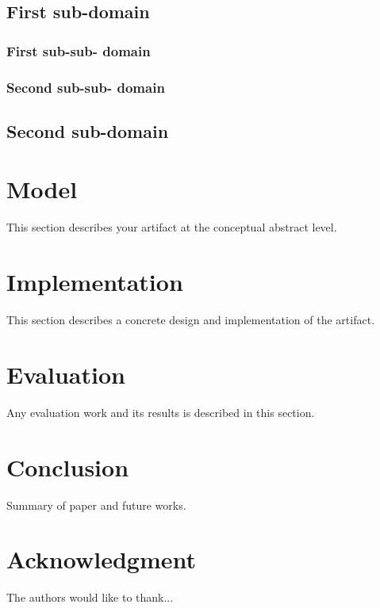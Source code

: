 \documentclass[10pt, conference, compsocconf]{IEEEtran}
\begin{document}
\subsection{First sub-domain}

\subsubsection{First sub-sub- domain}

\subsubsection{Second sub-sub- domain}

\subsection{Second sub-domain}



\section{Model}\label{sec:model}

This section describes your artifact at the conceptual abstract level.




\section{Implementation}\label{sec:implementation}
This section describes a concrete design and implementation of the artifact.



\section{Evaluation}\label{sec:evaluation}
Any evaluation work and its results is described in this section. 


\section{Conclusion}\label{sec:conclusion}
Summary of paper and future works.



\section*{Acknowledgment}
The authors would like to thank...





\end{document}
